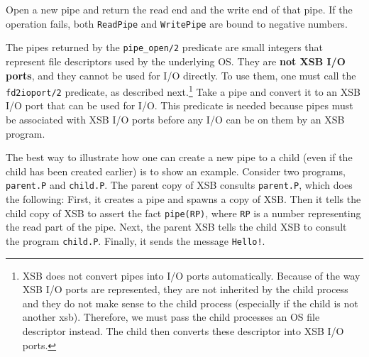 \begin{description}
  Open a new pipe and return the read end and the write end of that pipe.
  If the operation fails, both {\tt ReadPipe} and {\tt WritePipe} are bound
  to negative numbers.
  
  The pipes returned by the {\tt pipe\_open/2} predicate are small integers
  that represent file descriptors used by the underlying OS. They are {\bf
    not XSB I/O ports}, and they cannot be used for I/O directly. To
  use them, one must call the {\tt fd2ioport/2} predicate, as described
  next.\footnote{
    XSB does not convert pipes into I/O ports automatically.
    Because of the way XSB I/O ports are represented, they are not
    inherited by the child process and they do not make sense to the child
    process (especially if the child is not another xsb). Therefore, we
    must pass the child processes an OS file descriptor instead. The child then
    converts these descriptor into XSB I/O ports.
    }
    Take a pipe and convert it to an XSB I/O port that can be used
    for I/O. This predicate is needed because pipes must be associated with
    XSB I/O ports before any I/O can be on them by an XSB program.

    The best way to illustrate how one can create a new pipe to a child
    (even if the child has been created earlier) is to show an example.
    Consider two programs, {\tt parent.P} and {\tt child.P}. The parent
    copy of XSB consults {\tt parent.P}, which does the following: First, it
    creates a pipe and spawns a copy of XSB. Then it tells the
    child copy of XSB to assert the fact {\tt pipe(RP)}, where {\tt RP} is
    a number representing the read part of the pipe. Next, the parent XSB tells
    the child XSB to consult the program {\tt child.P}. Finally, it sends
    the message {\tt Hello!}.


\end{description}
